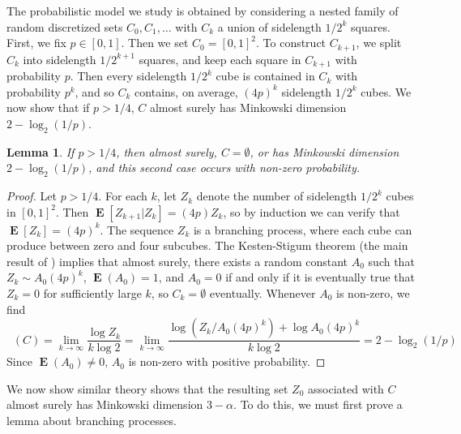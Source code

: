 \documentclass[dvipsnames,letterpaper,12pt]{article}
\numberwithin{equation}{section}
\theoremstyle{plain}
\newtheorem{lemma}{Lemma}
\DeclareMathOperator{\minkdim}{\dim_{\mathbf{M}}}
\DeclareMathOperator{\Expect}{\mathbf{E}}
\begin{document}
The probabilistic model we study is obtained by considering a nested family of random discretized sets $C_0,C_1, \dots$ with $C_k$ a union of sidelength $1/2^k$ squares. First, we fix $p \in [0,1]$. Then we set $C_0 = [0,1]^2$. To construct $C_{k+1}$, we split $C_k$ into sidelength $1/2^{k+1}$ squares, and keep each square in $C_{k+1}$ with probability $p$. Then every sidelength $1/2^k$ cube is contained in $C_k$ with probability $p^k$, and so $C_k$ contains, on average, $(4p)^k$ sidelength $1/2^k$ cubes. We now show that if $p > 1/4$, $C$ almost surely has Minkowski dimension $2 - \log_2(1/p)$.

\begin{lemma} \label{randomdimension}
	If $p > 1/4$, then almost surely, $C = \emptyset$, or has Minkowski dimension $2 - \log_2(1/p)$, and this second case occurs with non-zero probability.%
\end{lemma}
\begin{proof}
	Let $p > 1/4$. For each $k$, let $Z_k$ denote the number of sidelength $1/2^k$ cubes in $[0,1]^2$. Then $\Expect[Z_{k+1}|Z_k] = (4p) Z_k$, so by induction we can verify that $\Expect[Z_k] = (4p)^k$. The sequence $Z_k$ is a branching process, where each cube can produce between zero and four subcubes. The Kesten-Stigum theorem (the main result of \cite{KestenStigum}) implies that almost surely, there exists a random constant $A_0$ such that $Z_k \sim A_0 (4p)^k$, $\Expect(A_0) = 1$, and $A_0 = 0$ if and only if it is eventually true that $Z_k = 0$ for sufficiently large $k$, so $C_k = \emptyset$ eventually. Whenever $A_0$ is non-zero, we find
	\[ \minkdim(C) = \lim_{k \to \infty} \frac{\log Z_k}{k \log 2} = \lim_{k \to \infty} \frac{\log(Z_k/A_0 (4p)^k) + \log A_0 (4p)^k}{k \log 2} = 2 - \log_2(1/p) \]
	Since $\Expect(A_0) \neq 0$, $A_0$ is non-zero with positive probability. %
\end{proof}

We now show similar theory shows that the resulting set $Z_0$ associated with $C$ almost surely has Minkowski dimension $3 - \alpha$. To do this, we must first prove a lemma about branching processes.
\end{document}
